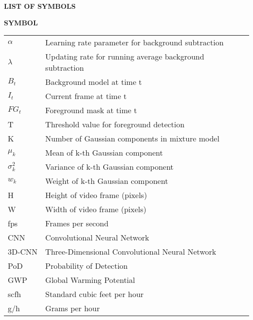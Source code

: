 \newpage
\thispagestyle{empty}

\begin{center}
\fontsize{12}{18}\bfseries\selectfont
LIST OF SYMBOLS
\end{center}

\vspace{6pt}

\noindent\fontsize{12}{18}\bfseries\selectfont
SYMBOL \hfill 

\vspace{6pt}

\normalfont\fontsize{12}{18}\selectfont
\begin{longtable}{@{}p{2cm}p{12cm}@{}}
\( \alpha \) & Learning rate parameter for background subtraction \\[0pt]
\( \lambda \) & Updating rate for running average background subtraction \\[0pt]
\( B_t \) & Background model at time t \\[0pt]
\( I_t \) & Current frame at time t \\[0pt]
\( FG_t \) & Foreground mask at time t \\[0pt]
T & Threshold value for foreground detection \\[0pt]
K & Number of Gaussian components in mixture model \\[0pt]
\( \mu_k \) & Mean of k-th Gaussian component \\[0pt]
\( \sigma_k^2 \) & Variance of k-th Gaussian component \\[0pt]
\( w_k \) & Weight of k-th Gaussian component \\[0pt]
H & Height of video frame (pixels) \\[0pt]
W & Width of video frame (pixels) \\[0pt]
fps & Frames per second \\[0pt]
CNN & Convolutional Neural Network \\[0pt]
3D-CNN & Three-Dimensional Convolutional Neural Network \\[0pt]
PoD & Probability of Detection \\[0pt]
GWP & Global Warming Potential \\[0pt]
scfh & Standard cubic feet per hour \\[0pt]
g/h & Grams per hour \\[0pt]
\end{longtable}